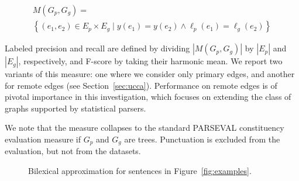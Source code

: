 \documentclass[11pt,a4paper]{article}
\newcommand{\secref}[1]{Section~\ref{#1}}
\newcommand{\figref}[1]{Figure~\ref{#1}}
\begin{document}
\vspace{-.6cm}

{\small
\begin{multline*}
    M(G_p,G_g) = \\
    \left\{(e_1,e_2) \in E_p \times E_g \;|\;
    y(e_1) = y(e_2) \wedge \ell_p(e_1)=\ell_g(e_2)\right\}
\end{multline*}
}

\vspace{-.6cm}

Labeled precision and recall are defined by dividing $|M(G_p,G_g)|$ by $|E_p|$ and $|E_g|$, respectively,
and F-score by taking their harmonic mean.
We report two variants of this measure: one where we consider only primary edges,
and another for remote edges (see \secref{sec:ucca}).
Performance on remote edges is of pivotal importance in this investigation,
which focuses on extending the class of graphs supported by statistical parsers.

We note that the measure collapses to the standard
PARSEVAL constituency evaluation measure if $G_p$ and $G_g$ are trees.
Punctuation is excluded from the evaluation, but not from the datasets.

\begin{figure}
\centering
{}
\caption{Bilexical approximation for sentences in \figref{fig:examples}.}
\label{fig:bilexical_example}
\end{figure}
\end{document}
